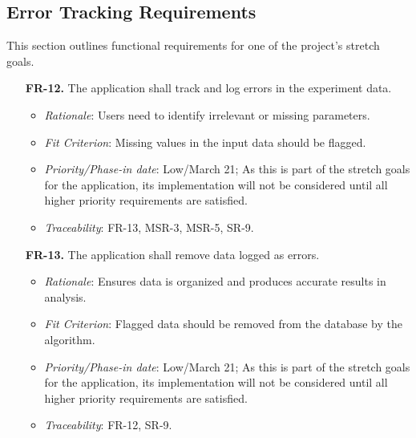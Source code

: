 \documentclass[12pt]{article}
\begin{document}
\subsection{Error Tracking Requirements}
This section outlines functional requirements for one of the project's stretch
goals.
\begin{enumerate}
  \item[\textbf{FR-12.}] The application shall track and log errors in the experiment data.
  \begin{itemize}
    \item \textit{Rationale}: Users need to identify irrelevant or missing parameters.
    \item \textit{Fit Criterion}: Missing values in the input data should be flagged.
    \item \textit{Priority/Phase-in date}: Low/March 21; As this is part of the stretch goals for the application, its implementation will not be considered until all higher priority requirements are satisfied.
    \item \textit{Traceability}: FR-13, MSR-3, MSR-5, SR-9.
  \end{itemize}
  \item[\textbf{FR-13.}] The application shall remove data logged as errors.
  \begin{itemize}
    \item \textit{Rationale}: Ensures data is organized and produces accurate results in analysis.
    \item \textit{Fit Criterion}: Flagged data should be removed from the database by the algorithm.
    \item \textit{Priority/Phase-in date}: Low/March 21; As this is part of the stretch goals for the application, its implementation will not be considered until all higher priority requirements are satisfied.
    \item \textit{Traceability}: FR-12, SR-9.
  \end{itemize}
\end{enumerate}
\end{document}
